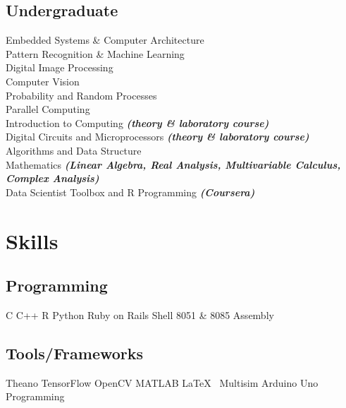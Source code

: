 \documentclass[]{deedy-resume-openfont}
\begin{document}
\begin{minipage}[t]{0.33\textwidth}
\subsection{Undergraduate}
Embedded Systems \& Computer Architecture\\
Pattern Recognition \& Machine Learning \\
Digital Image Processing \\
Computer Vision \\
Probability and Random Processes \\
Parallel Computing\\
Introduction to Computing {\footnotesize \textit{\textbf{(theory \& laboratory course) }}} \\
Digital Circuits and Microprocessors {\footnotesize \textit{\textbf{(theory \& laboratory course) }}} \\
Algorithms and Data Structure \\
Mathematics {\footnotesize \textit{\textbf{(Linear Algebra, Real Analysis, Multivariable Calculus, Complex Analysis) }}} \\
Data Scientist Toolbox and R Programming {\footnotesize \textit{\textbf{(Coursera) }}} \\





\section{Skills}
\subsection{Programming}
C \textbullet{} C++ \textbullet{} R \textbullet{} Python \textbullet{} Ruby on Rails \textbullet{} Shell \textbullet{} 8051 \& 8085 Assembly
\subsection{Tools/Frameworks}
Theano \textbullet{} TensorFlow \textbullet{} OpenCV \textbullet{} MATLAB \textbullet{} \LaTeX\ \textbullet{} Multisim \textbullet{} Arduino Uno Programming

\end{minipage}
\end{document}
